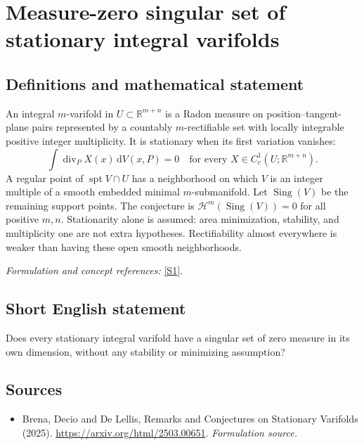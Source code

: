 \documentclass[11pt]{article}
\begin{document}
\section*{\texorpdfstring{Measure-zero singular set of stationary integral varifolds}{Measure-zero singular set of stationary integral varifolds}}\label{414}
\subsection{Definitions and mathematical statement}
An integral $m$-varifold in $U\subset{\mathbb{R}}^{m+n}$ is a Radon measure on position--tangent-plane pairs represented by a countably $m$-rectifiable set with locally integrable positive integer multiplicity. It is stationary when its first variation vanishes:
\[
 \int\operatorname{div}_P X(x){\,\mathrm{d}} V(x,P)=0
 \quad\text{for every }X\in C_c^1(U;{\mathbb{R}}^{m+n}).
\]
A regular point of $\operatorname{spt}V\cap U$ has a neighborhood on which $V$ is an integer multiple of a smooth embedded minimal $m$-submanifold. Let $\operatorname{Sing}(V)$ be the remaining support points. The conjecture is $\mathcal H^m(\operatorname{Sing}(V))=0$ for all positive $m,n$. Stationarity alone is assumed: area minimization, stability, and multiplicity one are not extra hypotheses. Rectifiability almost everywhere is weaker than having these open smooth neighborhoods.
\par\smallskip\textit{Formulation and concept references:} \href{https://arxiv.org/html/2503.00651}{[S1]}.

\subsection{Short English statement}
Does every stationary integral varifold have a singular set of zero measure in its own dimension, without any stability or minimizing assumption?
\subsection{Sources}
\begin{itemize}
\item[S1]Brena, Decio and De Lellis, Remarks and Conjectures on Stationary Varifolds (2025).
\url{https://arxiv.org/html/2503.00651}.
\textit{Formulation source.}
\end{itemize}
\end{document}
